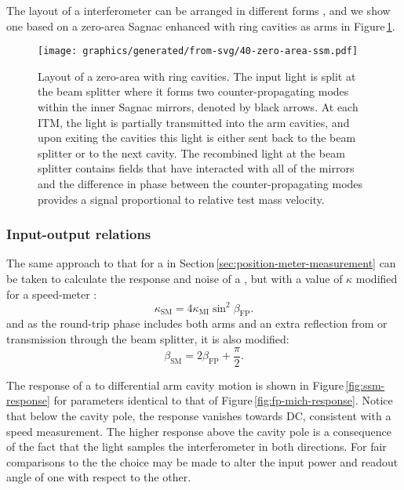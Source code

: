 The layout of a \SSM{} interferometer can be arranged in different forms \cite{Huttner2016}, and we show one based on a zero-area Sagnac enhanced with ring cavities as arms in Figure\,\ref{fig:zero-area-ssm}.

\begin{figure}
  \centering
  \texttt{[image: graphics/generated/from-svg/40-zero-area-ssm.pdf]}
  \caption[Layout of a zero-area \SSM{}]{\label{fig:zero-area-ssm}Layout of a zero-area \SSM{} with ring cavities. The input light is split at the beam splitter where it forms two counter-propagating modes within the inner Sagnac mirrors, denoted by black arrows. At each \gls{ITM}, the light is partially transmitted into the arm cavities, and upon exiting the cavities this light is either sent back to the beam splitter or to the next cavity. The recombined light at the beam splitter contains fields that have interacted with all of the mirrors and the difference in phase between the counter-propagating modes provides a signal proportional to relative test mass velocity.}
\end{figure} 

\subsubsection{Input-output relations}
The same approach to that for a \FPMI{} in Section\,\ref{sec:position-meter-measurement} can be taken to calculate the response and noise of a \SM{}, but with a value of $\kappa$ modified for a speed-meter \cite{Chen2003}:
\begin{equation}
  \kappa_{\text{SM}} = 4 \kappa_{\text{MI}} \sin^2 \beta_{\text{FP}}.
\end{equation}
and as the round-trip phase includes both arms and an extra reflection from or transmission through the beam splitter, it is also modified:
\begin{equation}
  \beta_{\text{SM}} = 2 \beta_{\text{FP}} + \frac{\pi}{2}.
\end{equation}

The response of a \SSM{} to differential arm cavity motion is shown in Figure\,\ref{fig:ssm-response} for parameters identical to that of Figure\,\ref{fig:fp-mich-response}. Notice that below the cavity pole, the response vanishes towards \gls{DC}, consistent with a speed measurement. The higher response above the cavity pole is a consequence of the fact that the light samples the interferometer in both directions. For fair comparisons to the \MI{} the choice may be made to alter the input power and readout angle of one with respect to the other.

